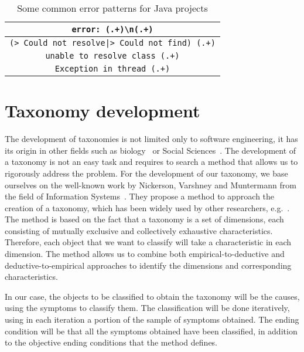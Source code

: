 \begin{table}
	\caption{Some common error patterns for Java projects}
	\label{table:commmonErrors}
	\begin{center}
		\begin{tabular}{c}
			\toprule
			\verb|error: (.+)\n(.+)| \\
			\midrule
			\verb=(> Could not resolve|> Could not find) (.+)= \\
			\midrule
			\verb|unable to resolve class (.+)| \\
			\midrule
			\verb|Exception in thread (.+)| \\
			\bottomrule
		\end{tabular}
	\end{center}
\end{table}

\section{Taxonomy development}\label{subsec:taxonomy}

The development of taxonomies is not limited only to software engineering, it has its origin in other fields such as biology~\cite{eldredge1980phylogenetic,sneath1973numerical} or Social Sciences~\cite{bailey1994typologies}.
The development of a taxonomy is not an easy task and requires to search a method that allows us to rigorously address the problem.
For the development of our taxonomy, we base ourselves on the well-known work by Nickerson, Varshney and Muntermann from the field of Information Systems~\cite{Nickerson2013}.
They propose a method to approach the creation of a taxonomy, which has been widely used by other researchers, e.g.~\cite{Krug2012APT,Geiger2011ManagingTC}.
The method is based on the fact that a taxonomy is a set of dimensions, each consisting of mutually exclusive and collectively exhaustive characteristics.
Therefore, each object that we want to classify will take a characteristic in each dimension.
The method allows us to combine both empirical-to-deductive and deductive-to-empirical approaches to identify the dimensions and corresponding characteristics.

In our case, the objects to be classified to obtain the taxonomy will be the causes, using the symptoms to classify them.
The classification will be done iteratively, using in each iteration a portion of the sample of symptoms obtained.
The ending condition will be that all the symptoms obtained have been classified, in addition to the objective ending conditions that the method defines.



